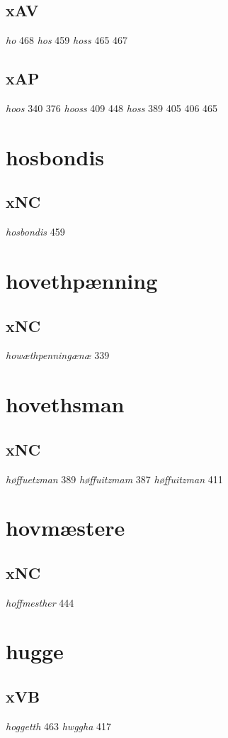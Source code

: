 \documentclass[a4paper,twocolumn]{article}
\begin{document}
\subsection{xAV}
\label{sec:org61e8cbc}
\emph{ho} 468 \emph{hos} 459 \emph{hoss} 465 467 
\subsection{xAP}
\label{sec:orgb9832fb}
\emph{hoos} 340 376 \emph{hooss} 409 448 \emph{hoss} 389 405 406 465 
\section{hosbondis}
\label{sec:org510c371}
\subsection{xNC}
\label{sec:org6fe5687}
\emph{hosbondis} 459 
\section{hovethpænning}
\label{sec:org69e15dc}
\subsection{xNC}
\label{sec:orgdfee19d}
\emph{howæthpenningænæ} 339 
\section{hovethsman}
\label{sec:org5565a2d}
\subsection{xNC}
\label{sec:orgcd7cbb9}
\emph{høffuetzman} 389 \emph{høffuitzmam} 387 \emph{høffuitzman} 411 
\section{hovmæstere}
\label{sec:orge66079f}
\subsection{xNC}
\label{sec:org2b4b150}
\emph{hoffmesther} 444 
\section{hugge}
\label{sec:org5b740eb}
\subsection{xVB}
\label{sec:orgfeb203b}
\emph{hoggetth} 463 \emph{hwggha} 417 
\end{document}
